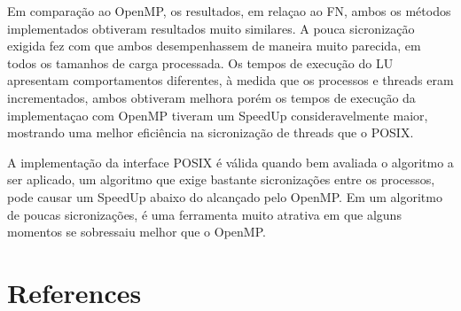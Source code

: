 \documentclass[12pt]{article}
\begin{document}
Em comparação ao OpenMP, os resultados, em relaçao ao FN, ambos os métodos implementados obtiveram resultados muito similares. A pouca sicronização exigida fez com que ambos desempenhassem de maneira muito parecida, em todos os tamanhos de carga processada. Os tempos de execução do LU apresentam comportamentos diferentes, à medida que os processos e threads eram incrementados, ambos obtiveram melhora porém os tempos de execução da implementaçao com OpenMP tiveram um SpeedUp consideravelmente maior, mostrando uma melhor eficiência na sicronização de threads que o POSIX. 

A implementação da interface POSIX é válida quando bem avaliada o algoritmo a ser aplicado, um algoritmo que exige bastante sicronizações entre os processos, pode causar um SpeedUp abaixo do alcançado pelo OpenMP. Em um algoritmo de poucas sicronizações, é uma ferramenta muito atrativa em que alguns momentos se sobressaiu melhor que o OpenMP.








\section{References}




\end{document}
